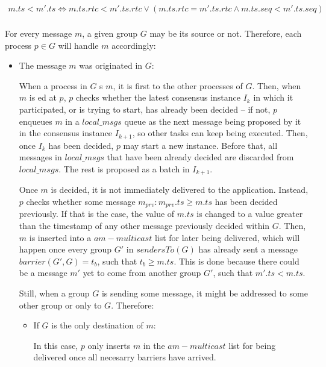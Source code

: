 \documentclass[times, 10pt]{article}
\begin{document}
\begin{align*}
m.ts < m'.ts \Longleftrightarrow m.ts.rtc < m'.ts.rtc \vee (m.ts.rtc = m'.ts.rtc \wedge m.ts.seq < m'.ts.seq)\\
\end{align*}

For every message $m$, a given group $G$ may be its source or not. Therefore, each process $p \in G$ will handle $m$ accordingly:

\begin{itemize}
  \item The message $m$ was originated in $G$:
  
  When a process in $G$ \amcast{}s $m$, it is first \rmcast{} to the other processes of $G$. Then, when $m$ is \rmdel{}ed at $p$, $p$ checks whether the latest consensus instance $I_{k}$ in which it participated, or is trying to start, has already been decided -- if not, $p$ enqueues $m$ in a $local\_msgs$ queue as the next message being proposed by it in the consensus instance $I_{k+1}$, so other tasks can keep being executed. Then, once $I_{k}$ has been decided, $p$ may start a new instance. Before that, all messages in $local\_msgs$ that have been already decided are discarded from $local\_msgs$. The rest is proposed as a batch in $I_{k+1}$.
  
  Once $m$ is decided, it is not immediately delivered to the application. Instead, $p$ checks whether some message $m_{prv} : m_{prv}.ts \geq m.ts$ has been decided previously. If that is the case, the value of $m.ts$ is changed to a value greater than the timestamp of any other message previously decided within $G$. Then, $m$ is inserted into a $am-multicast$ list for later being delivered, which will happen once every group $G'$ in $sendersTo(G)$ has already sent a message $barrier(G',G) = t_b$, such that $t_b \geq m.ts$. This is done because there could be a message $m'$ yet to come from another group $G'$, such that $m'.ts < m.ts$.
  
  Still, when a group $G$ is sending some message, it might be addressed to some other group or only to $G$. Therefore:
  
  \begin{itemize}
    \item If $G$ is the only destination of $m$:
    
    In this case, $p$ only inserts $m$ in the $am-multicast$ list for being delivered once all necesarry barriers have arrived.
    

\end{itemize}
\end{itemize}
\end{document}
